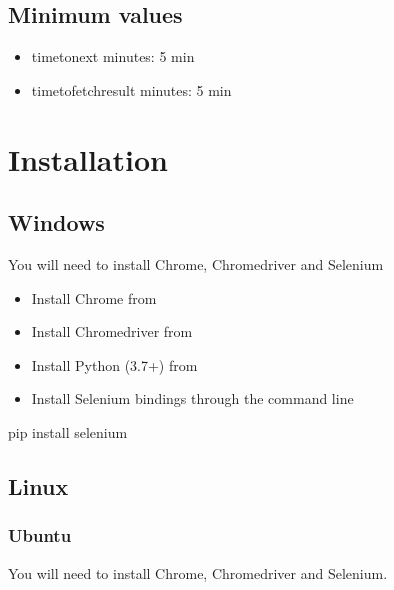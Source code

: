 \documentclass[letterpaper,10pt,english]{sphinxmanual}
\begin{document}
\section{Minimum values}
\label{\detokenize{index:minimum-values}}\begin{itemize}
\item {} 
\textendash{}time\sphinxhyphen{}to\sphinxhyphen{}next minutes: 5 min

\item {} 
\textendash{}time\sphinxhyphen{}to\sphinxhyphen{}fetch\sphinxhyphen{}result minutes: 5 min

\end{itemize}


\chapter{Installation}
\label{\detokenize{index:installation}}

\section{Windows}
\label{\detokenize{index:windows}}
You will need to install Chrome, Chromedriver and Selenium
\begin{itemize}
\item {} 
Install Chrome from 

\item {} 
Install Chromedriver from 

\item {} 
Install Python (3.7+) from 

\item {} 
Install Selenium bindings through the command line

\end{itemize}

\begin{sphinxVerbatim}[commandchars=\\\{\}]
\PYGZgt{} pip install selenium
\end{sphinxVerbatim}


\section{Linux}
\label{\detokenize{index:linux}}

\subsection{Ubuntu}
\label{\detokenize{index:ubuntu}}
You will need to install Chrome, Chromedriver and Selenium.
\end{document}
